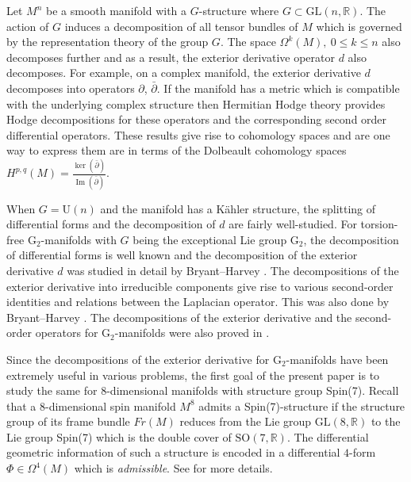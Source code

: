\documentclass[10pt,a4paper,reqno]{article}
\theoremstyle{definition}
\numberwithin{equation}{section}
\def\bR{\mathbb R}
\def\G2{\mathrm{G}_2}
\def\SO{\mathrm{SO}}
\def\GL{\mathrm{GL}}
\def\U{\mathrm{U}}
\DeclareMathOperator{\Ima}{Im}
\begin{document}
\medskip

Let $M^n$ be a smooth manifold with a $G$-structure where $G\subset \GL(n, \bR)$. The action of $G$ induces a decomposition of all tensor bundles of $M$ which is governed by the representation theory of the group $G$. The space $\Omega^k(M),\ 0\leq k\leq n$ also decomposes further and as a result, the exterior derivative operator $d$ also decomposes. For example, on a complex manifold, the exterior derivative $d$ decomposes into operators $\partial$, $\bar\partial$. If the manifold has a metric which is compatible with the underlying complex structure then Hermitian Hodge theory provides Hodge decompositions for these operators and the corresponding second order differential operators. These results give rise to cohomology spaces and are one way to express them are in terms of the Dolbeault cohomology spaces $H^{p,q}(M)= \frac{\ker(\bar\partial)}{\Ima(\bar\partial)}$.

\medskip

When $G=\U(n)$ and the manifold has a K\"ahler structure, the splitting of differential forms and the decomposition of $d$ are fairly well-studied. For torsion-free $\G2$-manifolds with $G$ being the exceptional Lie group $\G2$, the decomposition of differential forms is well known and the decomposition of the exterior derivative $d$ was studied in detail by Bryant--Harvey \cite[Table 1]{bryant-someremarks}. The decompositions of the exterior derivative into irreducible components give rise to various second-order identities and relations between the Laplacian operator. This was also done by Bryant--Harvey \cite[Table 2 and 3]{bryant-someremarks}. The decompositions of the exterior derivative and the second-order operators for $\G2$-manifolds were also proved in \cite{chan-karigiannis-tsang}. 

\medskip

Since the decompositions of the exterior derivative for $\G2$-manifolds have been extremely useful in various problems, the first goal of the present paper is to study the same for $8$-dimensional manifolds with structure group Spin(7). Recall that a $8$-dimensional spin manifold $M^8$ admits a Spin(7)-structure if the structure group of its frame bundle $Fr(M)$ reduces from the Lie group $\GL(8, \bR)$ to the Lie group Spin(7) which is the double cover of $\SO(7, \bR)$. The differential geometric information of such a structure is encoded in a differential $4$-form $\Phi\in \Omega^4(M)$ which is \emph{admissible}. See  for more details. 
\end{document}
